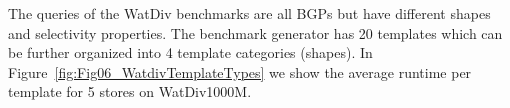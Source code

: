 
%

%
%
%
The queries of the WatDiv benchmarks are all BGPs but have different shapes and selectivity properties. The benchmark generator has 20 templates which can be further organized into 4 template categories (shapes). 
In Figure~\ref{fig:Fig06_WatdivTemplateTypes} we show the average runtime per template for 5 stores on WatDiv1000M.
